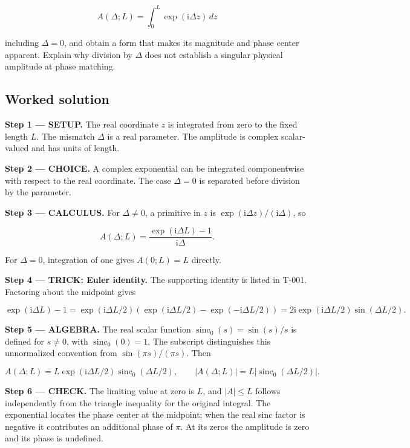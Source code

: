 \documentclass[11pt,oneside,openany]{book}
\begin{document}
\[
A(\Delta;L)=\int_0^L\exp(\mathrm{i}\Delta z)\,dz
\]

including \(\Delta=0\), and obtain a form that makes its magnitude and phase center apparent. Explain why division by \(\Delta\) does not establish a singular physical amplitude at phase matching.
\subsection*{Worked solution}

\textbf{Step 1 --- SETUP.} The real coordinate \(z\) is integrated from zero to the fixed length \(L\). The mismatch \(\Delta\) is a real parameter. The amplitude is complex scalar-valued and has units of length.

\begin{ChoiceStep}
\textbf{Step 2 --- CHOICE.} A complex exponential can be integrated componentwise with respect to the real coordinate. The case \(\Delta=0\) is separated before division by the parameter.

\end{ChoiceStep}
\textbf{Step 3 --- CALCULUS.} For \(\Delta\ne0\), a primitive in \(z\) is \(\exp(\mathrm{i}\Delta z)/(\mathrm{i}\Delta)\), so

\[
A(\Delta;L)=\frac{\exp(\mathrm{i}\Delta L)-1}{\mathrm{i}\Delta}.
\]

For \(\Delta=0\), integration of one gives \(A(0;L)=L\) directly.

\begingroup\color{TrickPurple}
\textbf{Step 4 --- TRICK: Euler identity.} The supporting identity is listed in T-001. Factoring about the midpoint gives

\[
\exp(\mathrm{i}\Delta L)-1
=\exp(\mathrm{i}\Delta L/2)\left(\exp(\mathrm{i}\Delta L/2)-\exp(-\mathrm{i}\Delta L/2)\right)
=2\mathrm{i}\exp(\mathrm{i}\Delta L/2)\sin(\Delta L/2).
\]

\endgroup
\begingroup\color{AlgebraBlue}
\textbf{Step 5 --- ALGEBRA.} The real scalar function \(\operatorname{sinc}_0(s)=\sin(s)/s\) is defined for \(s\ne0\), with \(\operatorname{sinc}_0(0)=1\). The subscript distinguishes this unnormalized convention from \(\sin(\pi s)/(\pi s)\). Then

\[
A(\Delta;L)=L\exp(\mathrm{i}\Delta L/2)\operatorname{sinc}_0(\Delta L/2),\qquad
|A(\Delta;L)|=L|\operatorname{sinc}_0(\Delta L/2)|.
\]

\endgroup
\textbf{Step 6 --- CHECK.} The limiting value at zero is \(L\), and \(|A|\le L\) follows independently from the triangle inequality for the original integral. The exponential locates the phase center at the midpoint; when the real sinc factor is negative it contributes an additional phase of \(\pi\). At its zeros the amplitude is zero and its phase is undefined.
\end{document}
